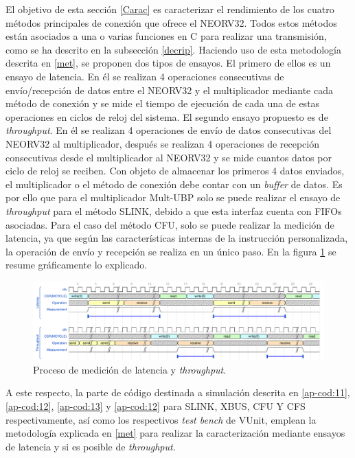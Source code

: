 El objetivo de esta sección \ref{Carac} es caracterizar el rendimiento de los cuatro métodos principales de conexión que ofrece el NEORV32.
Todos estos métodos están asociados a una o varias funciones en C para realizar una transmisión, como se ha descrito en la subsección \ref{decrip}.
Haciendo uso de esta metodología descrita en \ref{met}, se proponen dos tipos de ensayos.
El primero de ellos es un ensayo de latencia.
En él se realizan 4 operaciones consecutivas de envío/recepción de datos entre el NEORV32 y el multiplicador mediante cada método de conexión y se mide el tiempo de ejecución de cada una de estas operaciones en ciclos de reloj del sistema.
El segundo ensayo propuesto es de \textit{throughput}.
En él se realizan 4 operaciones de envío de datos consecutivas del NEORV32 al multiplicador, después se realizan 4 operaciones de recepción consecutivas desde el multiplicador al NEORV32 y se mide cuantos datos por ciclo de reloj se reciben.
Con objeto de almacenar los primeros 4 datos enviados, el multiplicador o el método de conexión debe contar con un \textit{buffer} de datos.
Es por ello que para el multiplicador Mult-UBP solo se puede realizar el ensayo de \textit{throughput} para el método SLINK, debido a que esta interfaz cuenta con FIFOs asociadas.
Para el caso del método CFU, solo se puede realizar la medición de latencia, ya que según las características internas de la instrucción personalizada, la operación de envío y recepción se realiza en un único paso.
En la figura \ref{fig:lat-thr} se resume gráficamente lo explicado.

\begin{figure}[h!]
    \centering
    \includegraphics[width=14cm]{Figuras/wave_process.pdf}
    \caption{Proceso de medición de latencia y \textit{throughput}.}
    \label{fig:lat-thr}
\end{figure}

A este respecto, la parte de código destinada a simulación descrita en \ref{ap-cod:11}, \ref{ap-cod:12}, \ref{ap-cod:13} y \ref{ap-cod:12} para SLINK, XBUS, CFU Y CFS respectivamente, así como los respectivos \textit{test bench} de VUnit, emplean la metodología explicada en \ref{met} para realizar la caracterización mediante ensayos de latencia y si es posible de \textit{throughput}.

